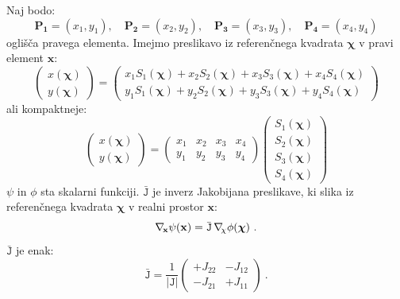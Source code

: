 Naj bodo:
\begin{equation}
   \mathbf{P_1} = (x_1,y_1), \quad \mathbf{P_2} = (x_2,y_2), \quad \mathbf{P_3} = (x_3,y_3), \quad \mathbf{P_4} = (x_4,y_4)
\end{equation}
oglišča pravega elementa.
Imejmo preslikavo iz referenčnega kvadrata $\bm{\chi}$ v pravi element $\mathbf{x}$:
\begin{equation}
   \begin{pmatrix}
      x(\bm{\chi}) \\
      y(\bm{\chi})
   \end{pmatrix}
   =
   \begin{pmatrix}
      x_1 S_1(\bm{\chi}) + x_2 S_2(\bm{\chi}) + x_3 S_3(\bm{\chi}) + x_4 S_4(\bm{\chi}) \\
      y_1 S_1(\bm{\chi}) + y_2 S_2(\bm{\chi}) + y_3 S_3(\bm{\chi}) + y_4 S_4(\bm{\chi})
   \end{pmatrix}
\end{equation}
ali kompaktneje:
\begin{equation}
   \begin{pmatrix}
      x(\bm{\chi}) \\
      y(\bm{\chi})
   \end{pmatrix}
   =
   \begin{pmatrix}
      x_1 & x_2 & x_3 & x_4 \\
      y_1 & y_2 & y_3 & y_4
   \end{pmatrix}
   \begin{pmatrix}
      S_1(\bm{\chi}) \\
      S_2(\bm{\chi}) \\
      S_3(\bm{\chi}) \\
      S_4(\bm{\chi})
   \end{pmatrix}
\end{equation}
$\psi$ in $\phi$ sta skalarni funkciji. $\bar{\texttt{J}}$ je inverz Jakobijana preslikave, ki slika iz referenčnega kvadrata $\bm{\chi}$ v realni prostor $\mathbf{x}$:
\begin{equation}
   \mathbf{\nabla_{\mkern-3mu x}} \psi(\mathbf{x}) = \bar{\texttt{J}} \mkern3mu \mathbf{\nabla_{\mkern-4mu \chi}} \phi(\bm{\chi}) \ .
\end{equation}
$\bar{\texttt{J}}$ je enak:
\begin{equation}
   \bar{\texttt{J}}
   =
   \frac{1}{|\texttt{J}|}
   \begin{pmatrix}
      +J_{22} & -J_{12} \\
      -J_{21} & +J_{11}
   \end{pmatrix}
   \ .
\end{equation}
